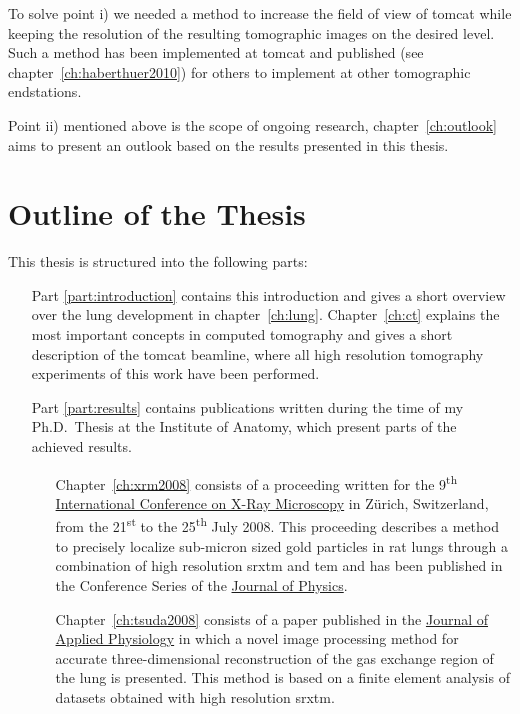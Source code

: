 To solve point i) we needed a method to increase the field of view of \ac{tomcat} while keeping the resolution of the resulting tomographic images on the desired level. Such a method has been implemented at \ac{tomcat} and published (see chapter~\ref{ch:haberthuer2010}) for others to implement at other tomographic endstations.

Point ii) mentioned above is the scope of ongoing research, chapter~\ref{ch:outlook} aims to present an outlook based on the results presented in this thesis. 

\section{Outline of the Thesis}
This thesis is structured into the following parts:
\begin{itemize}
	\item [Part \ref{part:introduction}] contains this introduction and gives a short overview over the lung development in chapter~\ref{ch:lung}. Chapter~\ref{ch:ct} explains the most important concepts in computed tomography and gives a short description of the \acf{tomcat} beamline, where all high resolution tomography experiments of this work have been performed.
	\item [Part \ref{part:results}] contains publications written during the time of my Ph.D.\ Thesis at the Institute of Anatomy, which present parts of the achieved results.
	\begin{itemize}
		\item [Chapter~\ref{ch:xrm2008}] consists of a proceeding written for the 9\textsuperscript{th} \href{http://xrm2008.web.psi.ch/}{International Conference on X-Ray Microscopy} in Zürich, Switzerland, from the 21\textsuperscript{st} to the 25\textsuperscript{th} July 2008. This proceeding describes a method to precisely localize sub-micron sized gold particles in rat lungs through a combination of high resolution \acl{srxtm} and \acl{tem} and has been published in the Conference Series of the \href{http://iopscience.iop.org/1742-6596/}{Journal of Physics}.
		
		\item [Chapter~\ref{ch:tsuda2008}] consists of a paper published in the \href{http://jap.physiology.org/}{Journal of Applied Physiology} in which a novel image processing method for accurate three-dimensional reconstruction of the gas exchange region of the lung is presented. This method is based on a finite element analysis of datasets obtained with high resolution \acl{srxtm}.


\end{itemize}
\end{itemize}
